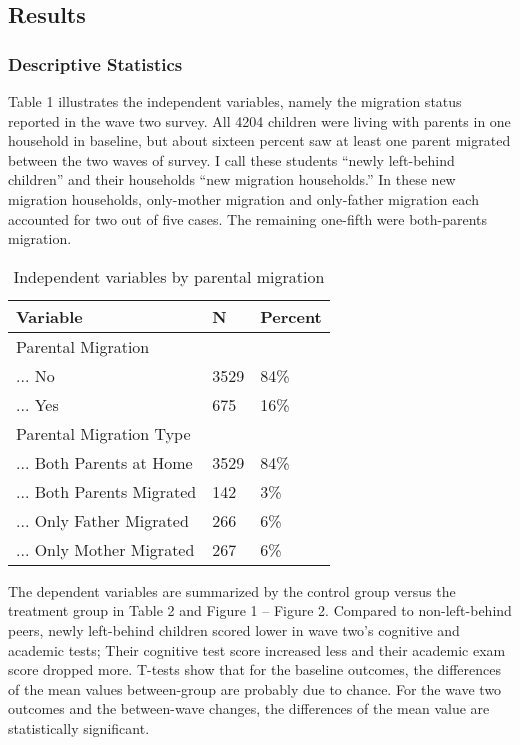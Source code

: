\documentclass[
  man]{apa7}
\begin{document}
\hypertarget{results}{%
\subsection{Results}\label{results}}

\hypertarget{descriptive-statistics}{%
\subsubsection{Descriptive Statistics}\label{descriptive-statistics}}

Table 1 illustrates the independent variables, namely the migration status reported in the wave two survey. All 4204 children were living with parents in one household in baseline, but about sixteen percent saw at least one parent migrated between the two waves of survey. I call these students ``newly left-behind children'' and their households ``new migration households.'' In these new migration households, only-mother migration and only-father migration each accounted for two out of five cases. The remaining one-fifth were both-parents migration.

\renewcommand{\arraystretch}{0.8}

\begin{table}

\caption{\label{tab:tab-idpvar}Independent variables by parental migration}
\centering
\begin{tabular}[t]{lll}
\toprule
Variable & N & Percent\\
\midrule
Parental Migration &  & \\
... No & 3529 & 84\%\\
... Yes & 675 & 16\%\\
Parental Migration Type &  & \\
... Both Parents at Home & 3529 & 84\%\\
\addlinespace
... Both Parents Migrated & 142 & 3\%\\
... Only Father Migrated & 266 & 6\%\\
... Only Mother Migrated & 267 & 6\%\\
\bottomrule
\end{tabular}
\end{table}

The dependent variables are summarized by the control group versus the treatment group in Table 2 and Figure 1 -- Figure 2. Compared to non-left-behind peers, newly left-behind children scored lower in wave two's cognitive and academic tests; Their cognitive test score increased less and their academic exam score dropped more. T-tests show that for the baseline outcomes, the differences of the mean values between-group are probably due to chance. For the wave two outcomes and the between-wave changes, the differences of the mean value are statistically significant.
\end{document}
